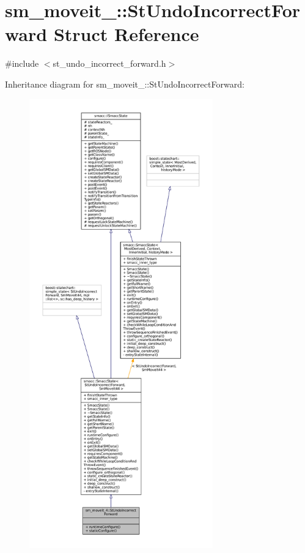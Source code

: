 \hypertarget{structsm__moveit__4_1_1StUndoIncorrectForward}{}\section{sm\+\_\+moveit\+\_\+:\+:St\+Undo\+Incorrect\+Forward Struct Reference}
\label{structsm__moveit__4_1_1StUndoIncorrectForward}


{\ttfamily \#include $<$st\+\_\+undo\+\_\+incorrect\+\_\+forward.\+h$>$}



Inheritance diagram for sm\+\_\+moveit\+\_\+:\+:St\+Undo\+Incorrect\+Forward\+:
\nopagebreak
\begin{figure}[H]
\begin{center}
\leavevmode
\includegraphics[height=550pt]{structsm__moveit__4_1_1StUndoIncorrectForward__inherit__graph}
\end{center}
\end{figure}


